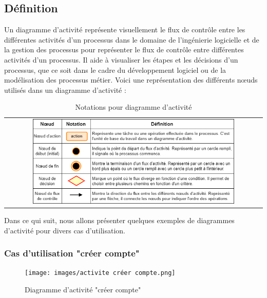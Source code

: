 \documentclass[edit,12pt,a4paper,ChapStyle,oneside,doubleinterligne]{report}
\begin{document}
\subsection{Définition}
Un diagramme d'activité représente visuellement le flux de contrôle entre les différentes activités d'un processus dans le domaine de l'ingénierie logicielle et de la gestion des processus pour représenter le flux de contrôle entre différentes activités d'un processus. Il aide à visualiser les étapes et les décisions d'un processus, que ce soit dans le cadre du développement logiciel ou de la modélisation des processus métier\cite{activite}.
\newline Voici une représentation des différents nœuds utilisés dans un diagramme d'activité :
\begin{table}[h!]
    \centering
    \begin{tabular}{c}
        \centering
        \includegraphics[width=0.8\textwidth]{images/activity.png}
    \end{tabular}
    \caption{Notations pour diagramme d'activité}
    \label{tab:da}
\end{table}
\clearpage
Dans ce qui suit, nous allons présenter quelques exemples de diagrammes d'activité pour divers cas d'utilisation.
\subsubsection{Cas d'utilisation "créer compte"}
\begin{figure}[h!]\label{fig:activite cree}
    \centering
    \texttt{[image: images/activite créer compte.png]}
    \caption{Diagramme d'activité "créer compte"}
\end{figure}
\clearpage
\end{document}
